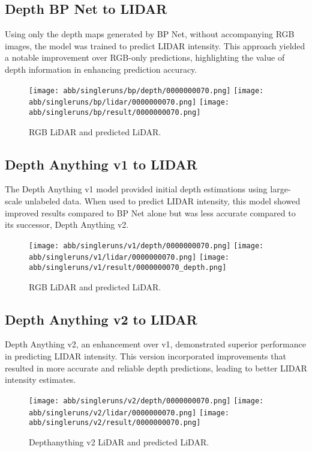 \subsection{Depth BP Net to LIDAR}

Using only the depth maps generated by BP Net, without accompanying RGB images, the model was trained to predict LIDAR intensity. This approach yielded a notable improvement over RGB-only predictions, highlighting the value of depth information in enhancing prediction accuracy.
\begin{figure}[!ht]
	\centering
	\texttt{[image: abb/singleruns/bp/depth/0000000070.png]}
	\texttt{[image: abb/singleruns/bp/lidar/0000000070.png]}
	\texttt{[image: abb/singleruns/bp/result/0000000070.png]}
	\caption{RGB LiDAR and predicted LiDAR.}
	\label{depth}
\end{figure}
\subsection{Depth Anything v1 to LIDAR}

The Depth Anything v1 model provided initial depth estimations using large-scale unlabeled data. When used to predict LIDAR intensity, this model showed improved results compared to BP Net alone but was less accurate compared to its successor, Depth Anything v2.
\begin{figure}[!ht]
	\centering
	\texttt{[image: abb/singleruns/v1/depth/0000000070.png]}
	\texttt{[image: abb/singleruns/v1/lidar/0000000070.png]}
	\texttt{[image: abb/singleruns/v1/result/0000000070\_depth.png]}
	\caption{RGB LiDAR and predicted LiDAR.}
	\label{depth}
\end{figure}
\subsection{Depth Anything v2 to LIDAR}

Depth Anything v2, an enhancement over v1, demonstrated superior performance in predicting LIDAR intensity. This version incorporated improvements that resulted in more accurate and reliable depth predictions, leading to better LIDAR intensity estimates.
\begin{figure}[!ht]
	\centering
	\texttt{[image: abb/singleruns/v2/depth/0000000070.png]}
	\texttt{[image: abb/singleruns/v2/lidar/0000000070.png]}
	\texttt{[image: abb/singleruns/v2/result/0000000070.png]}
	\caption{Depthanything v2 LiDAR and predicted LiDAR.}
	\label{depth}
\end{figure}

